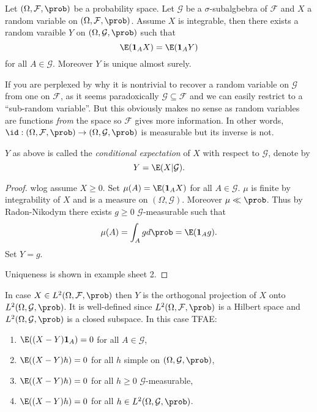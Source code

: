\documentclass[a4paper]{article}
\renewcommand{\P}{\prob} %
\begin{document}
\begin{proposition}
  Let \((\Omega, \mathcal F, \P)\) be a probability space. Let \(\mathcal G\) be a \(\sigma\)-subalgbebra of \(\mathcal F\) and \(X\) a random variable on \((\Omega, \mathcal F, \P)\). Assume \(X\) is integrable, then there exists a random varaible \(Y\) on \((\Omega, \mathcal G, \P)\) such that
  \[
    \E(\mathbf 1_A X) = \E(\mathbf 1_AY)
  \]
  for all \(A \in \mathcal G\). Moreover \(Y\) is unique almost surely.
\end{proposition}

If you are perplexed by why it is nontrivial to recover a random variable on \(\mathcal G\) from one on \(\mathcal F\), as it seems paradoxically \(\mathcal G \subseteq \mathcal F\) and we can easily restrict to a ``sub-random variable''. But this obviously makes no sense as random variables are functions \emph{from} the space so \(\mathcal F\) gives more information. In other words, \(\id: (\Omega, \mathcal F, \P) \to (\Omega, \mathcal G, \P)\) is measurable but its inverse is not.

\begin{definition}
  \(Y\) as above is called the \emph{conditional expectation} of \(X\) with respect to \(\mathcal G\), denote by
  \[
    Y = \E(X | \mathcal G).
  \]
\end{definition}

\begin{proof}
  wlog assume \(X \geq 0\). Set \(\mu(A) = \E(\mathbf 1_A X)\) for all \(A \in \mathcal G\). \(\mu\) is finite by integrability of \(X\) and is a measure on \((\Omega, \mathcal G)\). Moreover \(\mu \ll \P\). Thus by Radon-Nikodym there exists \(g \geq 0\) \(\mathcal G\)-measurable such that
  \[
    \mu(A) = \int_A g d\P = \E(\mathbf 1_A g).
  \]
  Set \(Y = g\).

  Uniqueness is shown in example sheet 2.
\end{proof}

\begin{remark}
  In case \(X \in L^2(\Omega, \mathcal F, \P)\) then \(Y\) is the orthogonal projection of \(X\) onto \(L^2(\Omega, \mathcal G, \P)\). It is well-defined since \(L^2(\Omega, \mathcal F, \P)\) is a Hilbert space and \(L^2(\Omega, \mathcal G, \P)\) is a closed subspace. In this case TFAE:
  \begin{enumerate}
  \item \(\E((X - Y) \mathbf 1_A) = 0\) for all \(A \in \mathcal G\),
  \item \(\E((X - Y) h) = 0\) for all \(h\) simple on \((\Omega, \mathcal G, \P)\),
  \item \(\E((X - Y) h) = 0\) for all \(h \geq 0\) \(\mathcal G\)-measurable,
  \item \(\E((X - Y) h) = 0\) for all \(h \in L^2(\Omega, \mathcal G, \P)\).
  \end{enumerate}
\end{remark}
\end{document}
